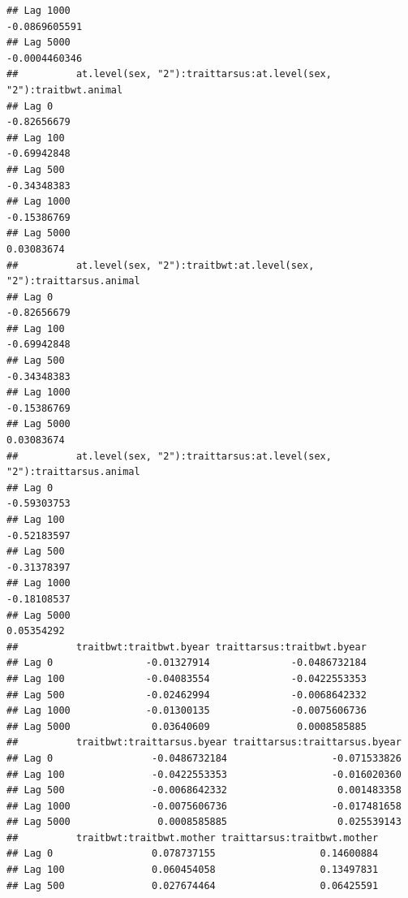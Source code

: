 \documentclass[
  12pt,
]{book}
\begin{document}
\begin{verbatim}
## Lag 1000                                                  -0.0869605591
## Lag 5000                                                  -0.0004460346
##          at.level(sex, "2"):traittarsus:at.level(sex, "2"):traitbwt.animal
## Lag 0                                                          -0.82656679
## Lag 100                                                        -0.69942848
## Lag 500                                                        -0.34348383
## Lag 1000                                                       -0.15386769
## Lag 5000                                                        0.03083674
##          at.level(sex, "2"):traitbwt:at.level(sex, "2"):traittarsus.animal
## Lag 0                                                          -0.82656679
## Lag 100                                                        -0.69942848
## Lag 500                                                        -0.34348383
## Lag 1000                                                       -0.15386769
## Lag 5000                                                        0.03083674
##          at.level(sex, "2"):traittarsus:at.level(sex, "2"):traittarsus.animal
## Lag 0                                                             -0.59303753
## Lag 100                                                           -0.52183597
## Lag 500                                                           -0.31378397
## Lag 1000                                                          -0.18108537
## Lag 5000                                                           0.05354292
##          traitbwt:traitbwt.byear traittarsus:traitbwt.byear
## Lag 0                -0.01327914              -0.0486732184
## Lag 100              -0.04083554              -0.0422553353
## Lag 500              -0.02462994              -0.0068642332
## Lag 1000             -0.01300135              -0.0075606736
## Lag 5000              0.03640609               0.0008585885
##          traitbwt:traittarsus.byear traittarsus:traittarsus.byear
## Lag 0                 -0.0486732184                  -0.071533826
## Lag 100               -0.0422553353                  -0.016020360
## Lag 500               -0.0068642332                   0.001483358
## Lag 1000              -0.0075606736                  -0.017481658
## Lag 5000               0.0008585885                   0.025539143
##          traitbwt:traitbwt.mother traittarsus:traitbwt.mother
## Lag 0                 0.078737155                  0.14600884
## Lag 100               0.060454058                  0.13497831
## Lag 500               0.027674464                  0.06425591

\end{verbatim}
\end{document}
